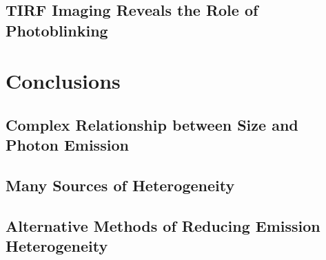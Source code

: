 \subsection{TIRF Imaging Reveals the Role of Photoblinking}

\section{Conclusions}
\subsection{Complex Relationship between Size and Photon Emission}
\subsection{Many Sources of Heterogeneity}
\subsection{Alternative Methods of Reducing Emission Heterogeneity}